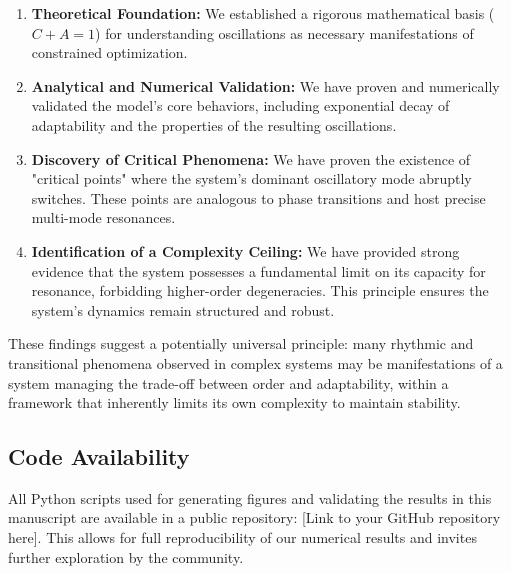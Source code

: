\documentclass[11pt,a4paper]{article}
\begin{document}
\begin{enumerate}
    \item \textbf{Theoretical Foundation:} We established a rigorous mathematical basis ($C+A=1$) for understanding oscillations as necessary manifestations of constrained optimization.
    \item \textbf{Analytical and Numerical Validation:} We have proven and numerically validated the model's core behaviors, including exponential decay of adaptability and the properties of the resulting oscillations.
    \item \textbf{Discovery of Critical Phenomena:} We have proven the existence of "critical points" where the system's dominant oscillatory mode abruptly switches. These points are analogous to phase transitions and host precise multi-mode resonances.
    \item \textbf{Identification of a Complexity Ceiling:} We have provided strong evidence that the system possesses a fundamental limit on its capacity for resonance, forbidding higher-order degeneracies. This principle ensures the system's dynamics remain structured and robust.
\end{enumerate}

These findings suggest a potentially universal principle: many rhythmic and transitional phenomena observed in complex systems may be manifestations of a system managing the trade-off between order and adaptability, within a framework that inherently limits its own complexity to maintain stability.

\subsection*{Code Availability}
All Python scripts used for generating figures and validating the results in this manuscript are available in a public repository: [Link to your GitHub repository here]. This allows for full reproducibility of our numerical results and invites further exploration by the community.



\end{document}
